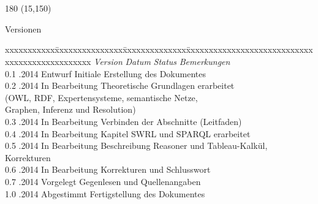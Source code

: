 
\chapter*{}
\label{chap:versionen}

\begin{textblock}{180} (15,150)
\color{black}
\begin{huge}
Versionen
\end{huge}
\vspace{10mm}

\fontsize{10pt}{18pt}\selectfont
\begin{tabbing}
xxxxxxxxxxx\=xxxxxxxxxxxxxxx\=xxxxxxxxxxxxxx\=xxxxxxxxxxxxxxxxxxxxxxxxxxxxxxxxxxxxxxxxxxxxxxx \kill
\textit{Version}    \> \textit{Datum}   \> \textit{Status}      \> \textit{Bemerkungen}\\
0.1                 .2014       \> Entwurf              \> Initiale Erstellung des Dokumentes\\
0.2                 .2014       \> In Bearbeitung       \> Theoretische Grundlagen erarbeitet \\
                    \>                  \>                      \> (OWL, RDF, Expertensysteme, semantische Netze, \\
                    \>                  \>                      \> Graphen, Inferenz und Resolution)\\
0.3                 .2014       \> In Bearbeitung       \> Verbinden der Abschnitte (Leitfaden)\\
0.4                 .2014       \> In Bearbeitung       \> Kapitel SWRL und SPARQL erarbeitet\\
0.5                 .2014       \> In Bearbeitung       \> Beschreibung Reasoner und Tableau-Kalkül, Korrekturen\\
0.6                 .2014       \> In Bearbeitung       \> Korrekturen und Schlusswort\\
0.7                 .2014       \> Vorgelegt            \> Gegenlesen und Quellenangaben\\
1.0                 .2014       \> Abgestimmt           \> Fertigstellung des Dokumentes\\
\end{tabbing}

\end{textblock}
